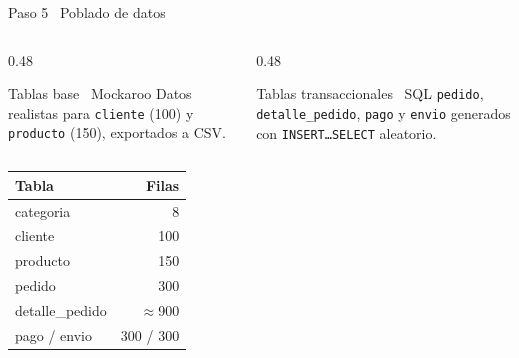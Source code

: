 \documentclass[aspectratio=169,10pt]{beamer}
\begin{document}
\begin{frame}{Paso 5 \textbar\ Poblado de datos}
  \begin{columns}[t]
    \begin{column}{0.48\textwidth}
      \begin{block}{Tablas base \textemdash\ Mockaroo}
        \small
        Datos realistas para \texttt{cliente} (100) y \texttt{producto} (150),
        exportados a CSV.
      \end{block}
    \end{column}
    \begin{column}{0.48\textwidth}
      \begin{block}{Tablas transaccionales \textemdash\ SQL}
        \small
        \texttt{pedido}, \texttt{detalle\_pedido}, \texttt{pago} y \texttt{envio}
        generados con \texttt{INSERT\ldots SELECT} aleatorio.
      \end{block}
    \end{column}
  \end{columns}
  \vspace{0.5em}
  \begin{center}
    \begin{tabular}{lr}
      \toprule
      \textbf{Tabla} & \textbf{Filas} \\
      \midrule
      categoria & 8 \\
      cliente & 100 \\
      producto & 150 \\
      pedido & 300 \\
      detalle\_pedido & $\approx$900 \\
      pago / envio & 300 / 300 \\
      \bottomrule
    \end{tabular}
  \end{center}
\end{frame}
\end{document}
